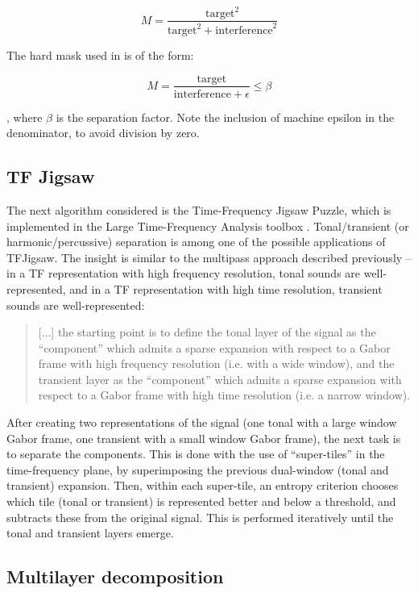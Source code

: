 \documentclass[letter,12pt]{article}
\begin{document}
\[ M = \frac{\text{target}^{2}}{\text{target}^{2} + \text{interference}^{2}} \]

The hard mask used in \cite{driedger} is of the form:

\[ M = \frac{\text{target}}{\text{interference}+\epsilon} \le \beta \]

, where $\beta$ is the separation factor. Note the inclusion of machine epsilon in the denominator, to avoid division by zero.

\subsection{TF Jigsaw}

The next algorithm considered is the Time-Frequency Jigsaw Puzzle\cite{tfjigsaw}, which is implemented in the Large Time-Frequency Analysis toolbox \cite{ltfat, tfjigsaw2, tfjigsaw3}. Tonal/transient (or harmonic/percussive) separation is among one of the possible applications of TFJigsaw. The insight is similar to the multipass approach described previously -- in a TF representation with high frequency resolution, tonal sounds are well-represented, and in a TF representation with high time resolution, transient sounds are well-represented:

\begin{quote}
	[...] the starting point is to define the tonal layer of the signal as the ``component'' which admits a sparse expansion with respect to a Gabor frame with high frequency resolution (i.e. with a wide window), and the transient layer as the ``component'' which admits a sparse expansion with respect to a Gabor frame with high time resolution (i.e. a narrow window).
\end{quote}

After creating two representations of the signal (one tonal with a large window Gabor frame, one transient with a small window Gabor frame), the next task is to separate the components. This is done with the use of ``super-tiles'' in the time-frequency plane, by superimposing the previous dual-window (tonal and transient) expansion. Then, within each super-tile, an entropy criterion chooses which tile (tonal or transient) is represented better and below a threshold, and subtracts these from the original signal. This is performed iteratively until the tonal and transient layers emerge.

\subsection{Multilayer decomposition}
\end{document}
